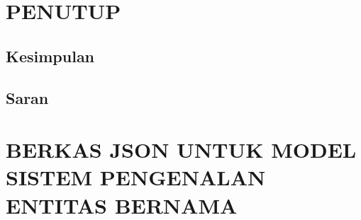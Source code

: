 \documentclass[ugmskripsi]{ugmskripsi}
\begin{document}


\chapter{PENUTUP}
\label{PENUTUP}

	\section{Kesimpulan}
	\label{penutup kesimpulan}
	

	\section{Saran}
	\label{penutup saran}
	





\appendix

\chapter{BERKAS JSON UNTUK MODEL SISTEM PENGENALAN ENTITAS BERNAMA}
\label{BERKAS JSON UNTUK MODEL SISTEM PENGENALAN ENTITAS BERNAMA}


\end{document}
